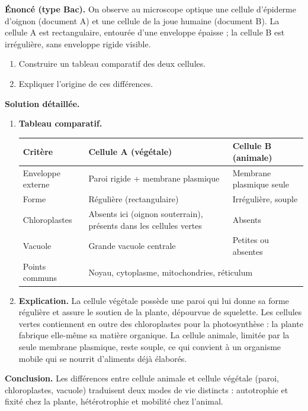 \documentclass[11pt]{article}
\newcommand{\cle}[1]{{\popxbold\color{popdark}#1}}
\begin{document}
\begin{exoresolu}
\textbf{Énoncé (type Bac).} On observe au microscope optique une cellule d'épiderme d'oignon (document A) et une cellule de la joue humaine (document B). La cellule A est rectangulaire, entourée d'une enveloppe épaisse ; la cellule B est irrégulière, sans enveloppe rigide visible.
\begin{enumerate}
\item Construire un tableau comparatif des deux cellules.
\item Expliquer l'origine de ces différences.
\end{enumerate}
\tcblower
\textbf{Solution détaillée.}
\begin{enumerate}
\item \textbf{Tableau comparatif.}
\begin{center}
\begin{tabularx}{\linewidth}{|l|X|X|}
\hline
\rowcolor{popblueL} \textbf{Critère} & \textbf{Cellule A (végétale)} & \textbf{Cellule B (animale)} \\
\hline
Enveloppe externe & Paroi rigide + membrane plasmique & Membrane plasmique seule \\
\hline
Forme & Régulière (rectangulaire) & Irrégulière, souple \\
\hline
Chloroplastes & Absents ici (oignon souterrain), présents dans les cellules vertes & Absents \\
\hline
Vacuole & Grande vacuole centrale & Petites ou absentes \\
\hline
Points communs & \multicolumn{2}{l|}{Noyau, cytoplasme, mitochondries, réticulum} \\
\hline
\end{tabularx}
\end{center}
\item \textbf{Explication.} La cellule végétale possède une \cle{paroi} qui lui donne sa forme régulière et assure le soutien de la plante, dépourvue de squelette. Les cellules vertes contiennent en outre des chloroplastes pour la photosynthèse : la plante fabrique elle-même sa matière organique. La cellule animale, limitée par la seule membrane plasmique, reste souple, ce qui convient à un organisme mobile qui se nourrit d'aliments déjà élaborés.
\end{enumerate}
\textbf{Conclusion.} Les différences entre cellule animale et cellule végétale (paroi, chloroplastes, vacuole) traduisent deux modes de vie distincts : autotrophie et fixité chez la plante, hétérotrophie et mobilité chez l'animal.
\end{exoresolu}
\end{document}
